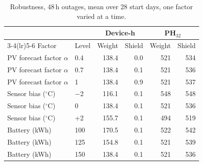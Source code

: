 \begin{table}[t]
\centering
\caption{Robustness, 48\,h outages, mean over 28 start days, one factor varied at a time.}
\label{tab:robust}
\setlength{\tabcolsep}{3pt}
\begin{tabular}{llrrrr}
\toprule
 & & \multicolumn{2}{c}{Device-h} & \multicolumn{2}{c}{PH$_{32}$} \\
\cmidrule(lr){3-4}\cmidrule(lr){5-6}
Factor & Level & Weight & Shield & Weight & Shield \\
\midrule
PV forecast factor $\alpha$ & 0.4 & 138.4 & 0.0 & 521 & 534 \\
PV forecast factor $\alpha$ & 0.7 & 138.4 & 0.1 & 521 & 536 \\
PV forecast factor $\alpha$ & 1 & 138.4 & 0.9 & 521 & 537 \\
Sensor bias ($^\circ$C) & $-$2 & 116.1 & 0.1 & 548 & 548 \\
Sensor bias ($^\circ$C) & 0 & 138.4 & 0.1 & 521 & 536 \\
Sensor bias ($^\circ$C) & +2 & 155.7 & 0.1 & 494 & 519 \\
Battery (kWh) & 100 & 170.5 & 0.1 & 522 & 542 \\
Battery (kWh) & 125 & 154.8 & 0.1 & 521 & 539 \\
Battery (kWh) & 150 & 138.4 & 0.1 & 521 & 536 \\
\bottomrule
\end{tabular}
\end{table}
